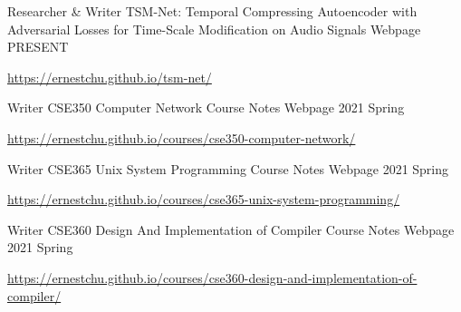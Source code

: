 

\begin{cventries}

  \cventry
    {Researcher \& Writer} %
    {TSM-Net: Temporal Compressing Autoencoder with Adversarial Losses for Time-Scale Modification on Audio Signals} %
    {Webpage} %
    {PRESENT} %
    {
      \begin{cvitems} %
        \item {\href{https://ernestchu.github.io/tsm-net/}{https://ernestchu.github.io/tsm-net/}}
      \end{cvitems}
    }

  \cventry
    {Writer} %
    {CSE350 Computer Network Course Notes} %
    {Webpage} %
    {2021 Spring} %
    {
      \begin{cvitems} %
        \item {\href{https://ernestchu.github.io/courses/cse350-computer-network/}{https://ernestchu.github.io/courses/cse350-computer-network/}}
      \end{cvitems}
    }

  \cventry
    {Writer} %
    {CSE365 Unix System Programming Course Notes} %
    {Webpage} %
    {2021 Spring} %
    {
      \begin{cvitems} %
        \item {\href{https://ernestchu.github.io/courses/cse365-unix-system-programming/}{https://ernestchu.github.io/courses/cse365-unix-system-programming/}}
      \end{cvitems}
    }

  \cventry
    {Writer} %
    {CSE360 Design And Implementation of Compiler Course Notes} %
    {Webpage} %
    {2021 Spring} %
    {
      \begin{cvitems} %
        \item {\href{https://ernestchu.github.io/courses/cse360-design-and-implementation-of-compiler/}{https://ernestchu.github.io/courses/cse360-design-and-implementation-of-compiler/}}
      \end{cvitems}
    }


\end{cventries}
